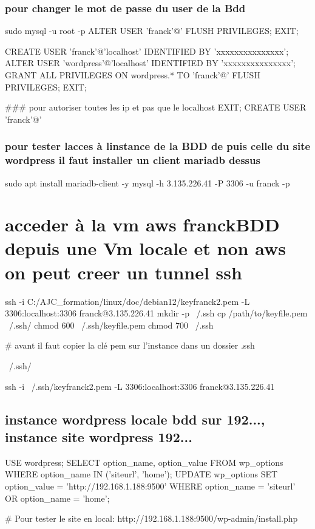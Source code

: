 \subsubsection*{pour changer le mot de passe du user de la Bdd}


\begin{DoxyCode}
sudo mysql -u root -p
ALTER USER 'franck'@'%
FLUSH PRIVILEGES;
EXIT;

CREATE USER 'franck'@'localhost' IDENTIFIED BY 'xxxxxxxxxxxxxxx';
ALTER USER 'wordpress'@'localhost' IDENTIFIED BY 'xxxxxxxxxxxxxxx';
GRANT ALL PRIVILEGES ON wordpress.* TO 'franck'@'%
FLUSH PRIVILEGES;
EXIT;

### pour autoriser toutes les ip et pas que le localhost
EXIT;
CREATE USER 'franck'@'%
\end{DoxyCode}


\subsubsection*{pour tester l\textquotesingle{}acces à l\textquotesingle{}instance de la B\+DD de puis celle du site wordpress il faut installer un client mariadb dessus}


\begin{DoxyCode}
sudo apt install mariadb-client -y
mysql -h 3.135.226.41 -P 3306 -u franck -p
\end{DoxyCode}


\section*{acceder à la vm aws franck\+B\+DD depuis une Vm locale et non aws on peut creer un tunnel ssh}


\begin{DoxyCode}
ssh -i  C:/AJC\_formation/linux/doc/debian12/keyfranck2.pem  -L 3306:localhost:3306 franck@3.135.226.41
mkdir -p ~/.ssh
cp /path/to/keyfile.pem ~/.ssh/
chmod 600 ~/.ssh/keyfile.pem
chmod 700 ~/.ssh

# avant il faut copier la clé pem sur l'instance dans un dossier .ssh

~/.ssh/

ssh -i ~/.ssh/keyfranck2.pem -L 3306:localhost:3306 franck@3.135.226.41
\end{DoxyCode}


\subsection*{instance wordpress locale bdd sur 192..., instance site wordpress 192...}


\begin{DoxyCode}
USE wordpress;
SELECT option\_name, option\_value FROM wp\_options WHERE option\_name IN ('siteurl', 'home');
UPDATE wp\_options SET option\_value = 'http://192.168.1.188:9500' WHERE option\_name = 'siteurl' OR
       option\_name = 'home';

# Pour tester le site en local:
http://192.168.1.188:9500/wp-admin/install.php
\end{DoxyCode}
 